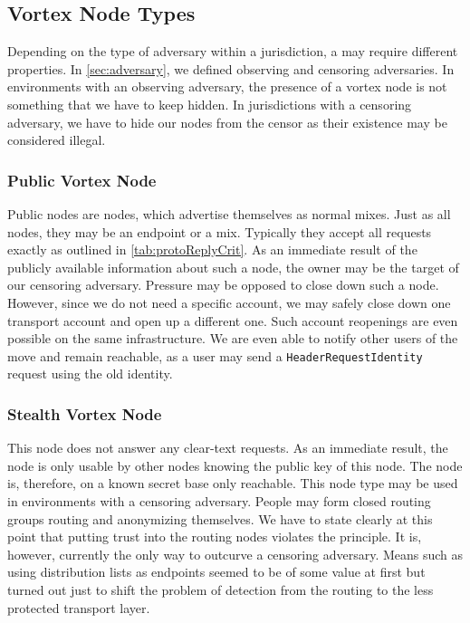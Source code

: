 \subsection{Vortex Node Types}\label{sec:vortexNodeTypes}
Depending on the type of adversary within a jurisdiction, a \VortexNode{} may require different properties. In \cref{sec:adversary}, we defined observing and censoring adversaries. In environments with an observing adversary, the presence of a vortex node is not something that we have to keep hidden. In jurisdictions with a censoring adversary, we have to hide our nodes from the censor as their existence may be considered illegal.

\subsubsection{Public Vortex Node}
Public nodes are nodes, which advertise themselves as normal mixes. Just as all nodes, they may be an endpoint or a mix. Typically they accept all requests exactly as outlined in \cref{tab:protoReplyCrit}. As an immediate result of the publicly available information about such a node, the owner may be the target of our censoring adversary. Pressure may be opposed to close down such a node. However, since we do not need a specific account, we may safely close down one transport account and open up a different one. Such account reopenings are even possible on the same infrastructure. We are even able to notify other users of the move and remain reachable, as a user may send a \texttt{HeaderRequestIdentity} request using the old identity. 

\subsubsection{Stealth Vortex Node}\label{sec:stealthNode}
This node does not answer any clear-text requests. As an immediate result, the node is only usable by other nodes knowing the public key of this node. The node is, therefore, on a known secret base only reachable. This node type may be used in environments with a censoring adversary. People may form closed routing groups routing and anonymizing themselves. We have to state clearly at this point that putting trust into the routing nodes violates the  principle. It is, however, currently the only way to outcurve a censoring adversary. Means such as using distribution lists as endpoints seemed to be of some value at first but turned out just to shift the problem of detection from the routing to the less protected transport layer.

